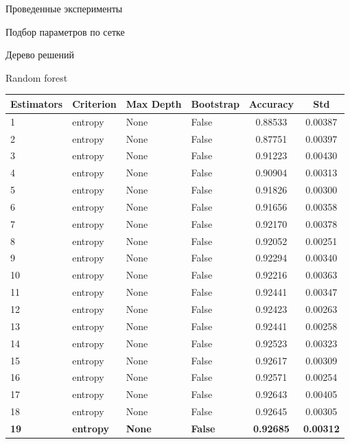 \begin{section}{Проведенные эксперименты}
\begin{subsection}{Подбор параметров по сетке}
\begin{subsubsection}{Дерево решений}
\begin{table}[H]
\caption{Подбор по сетке DT}
\label{grid:dt}
\end{table}


\end{subsubsection}


\begin{subsubsection}{Random forest}

  \begin{table}[H]
  \centering
  {\begin{tabular}{|l|l|l|l|c|c|}
  \hline
  \textbf{Estimators} & \textbf{Criterion} & \textbf{Max Depth} & \textbf{Bootstrap} & \textbf{Accuracy} & \textbf{Std} \\
  \hline
  1 & entropy  & None & False & 0.88533 & 0.00387 \\
  \hline
  2 & entropy  & None &  False & 0.87751 & 0.00397 \\
  \hline
  3 & entropy  & None & False & 0.91223 & 0.00430 \\
  \hline
  4 &  entropy & None  & False & 0.90904 & 0.00313 \\
  \hline
  5 & entropy  & None & False & 0.91826 & 0.00300 \\
  \hline
  6 & entropy  & None & False & 0.91656 & 0.00358 \\
  \hline
  7 & entropy  & None & False & 0.92170 & 0.00378 \\
  \hline
  8 &  entropy & None  & False & 0.92052 & 0.00251 \\
  \hline
  9 & entropy  & None & False & 0.92294 & 0.00340 \\
  \hline
  10 & entropy  & None & False & 0.92216 & 0.00363 \\
  \hline
  11  & entropy  & None & False & 0.92441 & 0.00347 \\
  \hline
  12  &  entropy & None  & False & 0.92423 & 0.00263 \\
  \hline
  13  & entropy  & None &  False & 0.92441 & 0.00258 \\
  \hline
  14  & entropy  & None & False & 0.92523 & 0.00323 \\
  \hline
  15 & entropy  & None & False & 0.92617 & 0.00309 \\
  \hline
  16 &  entropy & None  & False & 0.92571 & 0.00254 \\
  \hline
  17 & entropy  & None & False & 0.92643 & 0.00405 \\
  \hline
  18 & entropy  & None &  False & 0.92645 & 0.00305 \\
  \hline
  \textbf{19} & \textbf{entropy}  & \textbf{None} & \textbf{False} & \textbf{0.92685} & \textbf{0.00312} \\
  \hline
  \end{tabular}}


\end{table}
\end{subsubsection}
\end{subsection}
\end{section}
